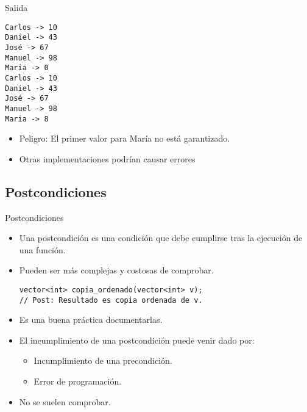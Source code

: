 
\begin{frame}[fragile]{Salida}
\begin{lstlisting}[style=terminal]
Carlos -> 10
Daniel -> 43
José -> 67
Manuel -> 98
Maria -> 0
Carlos -> 10
Daniel -> 43
José -> 67
Manuel -> 98
Maria -> 8
\end{lstlisting}
\begin{itemize}
  \item \alert{Peligro}: El primer valor para María no está garantizado.
  \item Otras implementaciones podrían causar errores
\end{itemize}
\end{frame}

\subsection{Postcondiciones}

\begin{frame}[fragile]{Postcondiciones}
\begin{itemize}
  \item Una \alert{postcondición} es una condición que debe cumplirse tras
        la ejecución de una función.
  \item Pueden ser más complejas y costosas de comprobar.
\begin{lstlisting}
vector<int> copia_ordenado(vector<int> v);
// Post: Resultado es copia ordenada de v.
\end{lstlisting}
  \item Es una buena práctica documentarlas.
  \item El incumplimiento de una postcondición puede venir dado por:
    \begin{itemize}
      \item Incumplimiento de una precondición.
      \item Error de programación.
    \end{itemize}
  \item No se suelen comprobar.
\end{itemize}
\end{frame}
